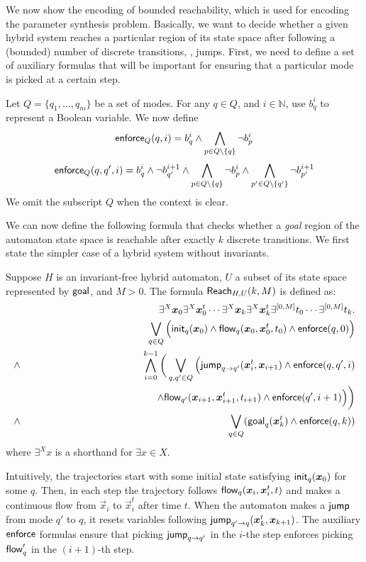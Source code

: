 We now show the encoding of bounded reachability, which is used for encoding the parameter synthesis
problem. Basically, we want to decide whether a given 
hybrid system reaches a particular region of its state space after following a (bounded) number
of discrete transitions, \ie, jumps. First, we need to define a set of auxiliary formulas that 
will be important for ensuring that a particular mode is picked at a certain step.
\begin{definition}
Let $Q = \{q_1,...,q_m\}$ be a set of modes. For any $q\in Q$, and $i\in\mathbb{N}$, use  $b_{q}^i$ to represent a Boolean variable. We now define
$$\mathsf{enforce}_Q(q,i) = b^i_{q} \wedge \bigwedge_{p\in Q\setminus\{q\}}\neg b^{i}_{p}$$
$$\mathsf{enforce}_Q(q, q',i) = b^{i}_{q}\wedge \neg b^{i+1}_{q'} \wedge \bigwedge_{p\in Q\setminus\{q\}} \neg b^i_{p} \wedge \bigwedge_{p'\in Q\setminus\{q'\}} \neg b^{i+1}_{p'}$$
We omit the subscript $Q$ when the context is clear.\end{definition}

We can now define the following formula that checks whether a {\em goal} region of the automaton
state space is reachable after exactly $k$ discrete transitions. We first state 
the simpler case of a hybrid system without invariants.
\begin{definition}
Suppose $H$ is an invariant-free hybrid automaton, $U$ a subset of its state space represented by $\mathsf{goal}$,
and $M>0$. The formula $\mathsf{Reach}_{H,U}(k,M)$ is defined as:
\begin{eqnarray*}
& &\exists^X \vec x_{0} \exists^X\vec x_{0}^t\cdots \exists^X \vec x_{k}\exists^X\vec x_{k}^t\exists^{[0,M]}t_0\cdots \exists^{[0,M]}t_k.\\
& &\bigvee_{q\in Q} \Big(\init_{q}(\vec x_{0})\wedge \flow_{q}(\vec x_{0}, \vec x_{0}^t, t_0)\wedge \enforce(q,0)\Big)\\%
\wedge & & \bigwedge_{i=0}^{k-1}\bigg( \bigvee_{q, q'\in Q} \Big(\jump_{q\rightarrow q'}(\vec x_{i}^t, \vec x_{i+1})\wedge \enforce(q,q',i)\\
& & \hspace{4.5cm}\wedge\flow_{q'}(\vec x_{i+1}, \vec x_{i+1}^t, t_{i+1})\wedge \enforce(q',i+1)\Big)\bigg)\\
\wedge & &\bigvee_{q\in Q} (\goal_q(\vec x_{k}^t)\wedge \enforce(q,k))
\end{eqnarray*}
where $\exists^X x$ is a shorthand for $\exists x\in X$.
\end{definition}
Intuitively, the trajectories start with some initial state satisfying $\init_q(\vec x_{0})$ for some $q$. 
Then, in each step the trajectory follows $\flow_q(\vec x_{i}, \vec x_{i}^t, t)$ and makes a continuous flow from $\vec x_i$ to $\vec x_i^t$ after time $t$. When the automaton makes a $\mathsf{jump}$ from mode $q'$ to $q$, it resets variables following $\jump_{q'\rightarrow q}(\vec x_{k}^t, \vec x_{k+1})$. The auxiliary $\mathsf{enforce}$ formulas ensure that picking $\mathsf{jump}_{q\rightarrow q'}$ in the $i$-the step enforces picking $\mathsf{flow}_q'$ in the $(i+1)$-th step.

